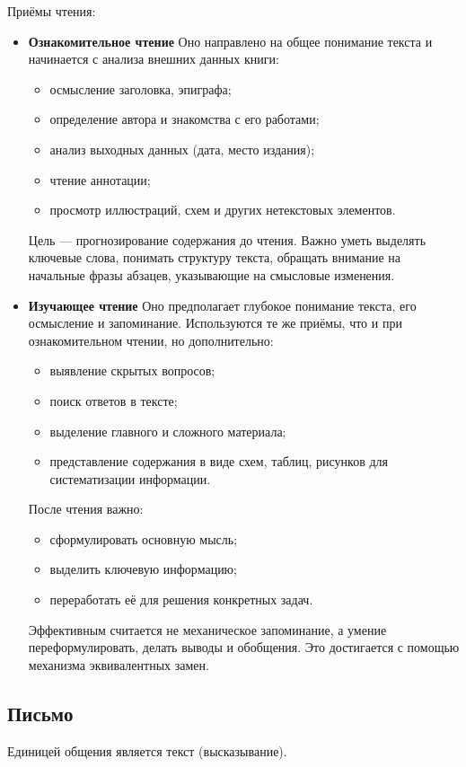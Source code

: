 Приёмы чтения:
\begin{itemize}
	\item \textbf{Ознакомительное чтение}
	Оно направлено на общее понимание текста и начинается с анализа внешних данных книги:
	\begin{itemize}
		\item осмысление заголовка, эпиграфа;
		\item определение автора и знакомства с его работами;
		\item анализ выходных данных (дата, место издания);
		\item чтение аннотации;
		\item просмотр иллюстраций, схем и других нетекстовых элементов.
	\end{itemize}
	Цель — прогнозирование содержания до чтения. Важно уметь выделять ключевые слова, понимать структуру текста, обращать внимание на начальные фразы абзацев, указывающие на смысловые изменения.
	\item \textbf{Изучающее чтение}
	Оно предполагает глубокое понимание текста, его осмысление и запоминание. Используются те же приёмы, что и при ознакомительном чтении, но дополнительно:
	\begin{itemize}
		\item выявление скрытых вопросов;
		\item поиск ответов в тексте;
		\item выделение главного и сложного материала;
		\item представление содержания в виде схем, таблиц, рисунков для систематизации информации.
	\end{itemize}
	После чтения важно:
	\begin{itemize}
		\item сформулировать основную мысль;
		\item выделить ключевую информацию;
		\item переработать её для решения конкретных задач.
	\end{itemize}
	Эффективным считается не механическое запоминание, а умение переформулировать, делать выводы и обобщения. Это достигается с помощью механизма эквивалентных замен.
\end{itemize}

\subsection{Письмо}
Единицей общения является текст (высказывание).

